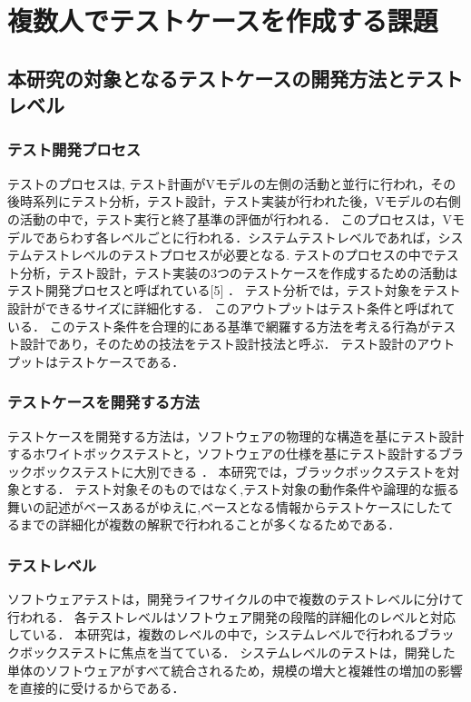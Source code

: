 \documentclass[10pt,a4j]{jarticle}
\begin{document}
\section{複数人でテストケースを作成する課題} \label{chap:2}
\subsection{本研究の対象となるテストケースの開発方法とテストレベル} \label{sec:2-1}
\subsubsection{テスト開発プロセス}
テストのプロセスは, テスト計画がVモデルの左側の活動と並行に行われ，その後時系列にテスト分析，テスト設計，テスト実装が行われた後，Vモデルの右側の活動の中で，テスト実行と終了基準の評価が行われる．
このプロセスは，Vモデルであらわす各レベルごとに行われる．システムテストレベルであれば，システムテストレベルのテストプロセスが必要となる.
テストのプロセスの中でテスト分析，テスト設計，テスト実装の3つのテストケースを作成するための活動はテスト開発プロセスと呼ばれている[5] ．
テスト分析では，テスト対象をテスト設計ができるサイズに詳細化する．
このアウトプットはテスト条件と呼ばれている．
このテスト条件を合理的にある基準で網羅する方法を考える行為がテスト設計であり，そのための技法をテスト設計技法と呼ぶ．
テスト設計のアウトプットはテストケースである．

\subsubsection{テストケースを開発する方法}
テストケースを開発する方法は，ソフトウェアの物理的な構造を基にテスト設計するホワイトボックステストと，ソフトウェアの仕様を基にテスト設計するブラックボックステストに大別できる\cite{myers2011art} ．
本研究では，ブラックボックステストを対象とする．
テスト対象そのものではなく,テスト対象の動作条件や論理的な振る舞いの記述がベースあるがゆえに,ベースとなる情報からテストケースにしたてるまでの詳細化が複数の解釈で行われることが多くなるためである．

\subsubsection{テストレベル}
ソフトウェアテストは，開発ライフサイクルの中で複数のテストレベルに分けて行われる．
各テストレベルはソフトウェア開発の段階的詳細化のレベルと対応している．
本研究は，複数のレベルの中で，システムレベルで行われるブラックボックステストに焦点を当てている．
システムレベルのテストは，開発した単体のソフトウェアがすべて統合されるため，規模の増大と複雑性の増加の影響を直接的に受けるからである．
\end{document}
